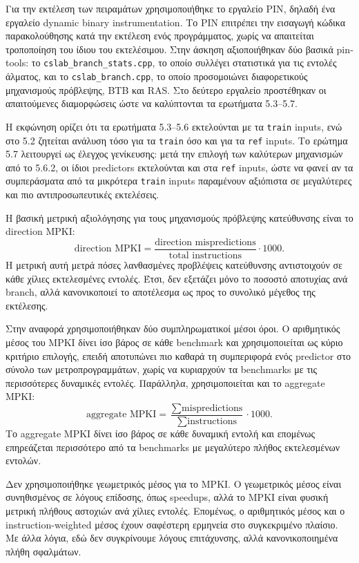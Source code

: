 \documentclass{article}
\begin{document}
Για την εκτέλεση των πειραμάτων χρησιμοποιήθηκε το εργαλείο \foreignlanguage{english}{PIN}, δηλαδή ένα εργαλείο \foreignlanguage{english}{dynamic binary instrumentation}. Το \foreignlanguage{english}{PIN} επιτρέπει την εισαγωγή κώδικα παρακολούθησης κατά την εκτέλεση ενός προγράμματος, χωρίς να απαιτείται τροποποίηση του ίδιου του εκτελέσιμου. Στην άσκηση αξιοποιήθηκαν δύο βασικά \foreignlanguage{english}{pintools}: το \texttt{cslab\_branch\_stats.cpp}, το οποίο συλλέγει στατιστικά για τις εντολές άλματος, και το \texttt{cslab\_branch.cpp}, το οποίο προσομοιώνει διαφορετικούς μηχανισμούς πρόβλεψης, BTB και RAS. Στο δεύτερο εργαλείο προστέθηκαν οι απαιτούμενες διαμορφώσεις ώστε να καλύπτονται τα ερωτήματα 5.3--5.7.

Η εκφώνηση ορίζει ότι τα ερωτήματα 5.3--5.6 εκτελούνται με τα \texttt{train} inputs, ενώ στο 5.2 ζητείται ανάλυση τόσο για τα \texttt{train} όσο και για τα \texttt{ref} inputs. Το ερώτημα 5.7 λειτουργεί ως έλεγχος γενίκευσης: μετά την επιλογή των καλύτερων μηχανισμών από το 5.6.2, οι ίδιοι predictors εκτελούνται και στα \texttt{ref} inputs, ώστε να φανεί αν τα συμπεράσματα από τα μικρότερα \texttt{train} inputs παραμένουν αξιόπιστα σε μεγαλύτερες και πιο αντιπροσωπευτικές εκτελέσεις.

Η βασική μετρική αξιολόγησης για τους μηχανισμούς πρόβλεψης κατεύθυνσης είναι το \foreignlanguage{english}{direction MPKI}:
\[
    \text{direction MPKI} =
    \frac{\text{direction mispredictions}}{\text{total instructions}} \cdot 1000.
\]
Η μετρική αυτή μετρά πόσες λανθασμένες προβλέψεις κατεύθυνσης αντιστοιχούν σε κάθε χίλιες εκτελεσμένες εντολές. Έτσι, δεν εξετάζει μόνο το ποσοστό αποτυχίας ανά branch, αλλά κανονικοποιεί το αποτέλεσμα ως προς το συνολικό μέγεθος της εκτέλεσης.

Στην αναφορά χρησιμοποιήθηκαν δύο συμπληρωματικοί μέσοι όροι. Ο αριθμητικός μέσος του MPKI δίνει ίσο βάρος σε κάθε benchmark και χρησιμοποιείται ως κύριο κριτήριο επιλογής, επειδή αποτυπώνει πιο καθαρά τη συμπεριφορά ενός predictor στο σύνολο των μετροπρογραμμάτων, χωρίς να κυριαρχούν τα benchmarks με τις περισσότερες δυναμικές εντολές. Παράλληλα, χρησιμοποιείται και το \foreignlanguage{english}{aggregate MPKI}:
\[
    \text{aggregate MPKI} =
    \frac{\sum \text{mispredictions}}{\sum \text{instructions}} \cdot 1000.
\]
Το aggregate MPKI δίνει ίσο βάρος σε κάθε δυναμική εντολή και επομένως επηρεάζεται περισσότερο από τα benchmarks με μεγαλύτερο πλήθος εκτελεσμένων εντολών.

Δεν χρησιμοποιήθηκε γεωμετρικός μέσος για το MPKI. Ο γεωμετρικός μέσος είναι συνηθισμένος σε λόγους επίδοσης, όπως speedups, αλλά το MPKI είναι φυσική μετρική πλήθους αστοχιών ανά χίλιες εντολές. Επομένως, ο αριθμητικός μέσος και ο instruction-weighted μέσος έχουν σαφέστερη ερμηνεία στο συγκεκριμένο πλαίσιο. Με άλλα λόγια, εδώ δεν συγκρίνουμε λόγους επιτάχυνσης, αλλά κανονικοποιημένα πλήθη σφαλμάτων.
\end{document}
